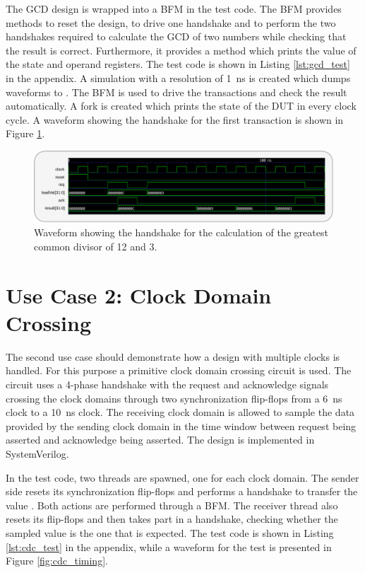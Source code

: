 The GCD design is wrapped into a BFM in the test code. The BFM provides methods to reset the design, to drive one
handshake and to perform the two handshakes required to calculate the GCD of two numbers while checking that the
result is correct. Furthermore, it provides a method which prints the value of the state and operand registers. The
test code is shown in Listing \ref{lst:gcd_test} in the appendix. A simulation with a resolution of \SI{1}{ns} is
created which dumps waveforms to . The BFM is used to drive the transactions and check the result
automatically. A fork is created which prints the state of the DUT in every clock cycle. A waveform showing the
handshake for the first transaction is shown in Figure \ref{fig:gcd_timing}.

\begin{figure}[t]
  \centering
  \includegraphics[width=\textwidth]{diagrams/gcd_timing.pdf}
  \caption{Waveform showing the handshake for the calculation of the greatest common divisor of 12 and 3.}
  \label{fig:gcd_timing}
\end{figure}

\section{Use Case 2: Clock Domain Crossing} %

The second use case should demonstrate how a design with multiple clocks is handled. For this purpose a primitive
clock domain crossing circuit is used. The circuit uses a 4-phase handshake with the request and acknowledge signals
crossing the clock domains through two synchronization flip-flops from a \SI{6}{ns} clock to a \SI{10}{ns} clock. The
receiving clock domain is allowed to sample the data provided by the sending clock domain in the time window between
request being asserted and acknowledge being asserted. The design is implemented in SystemVerilog.

In the test code, two threads are spawned, one for each clock domain. The sender side resets its synchronization
flip-flops and performs a handshake to transfer the value . Both actions are performed through a BFM.
The receiver thread also resets its flip-flops and then takes part in a handshake, checking whether the sampled value
is the one that is expected. The test code is shown in Listing \ref{lst:cdc_test} in the appendix, while a waveform
for the test is presented in Figure \ref{fig:cdc_timing}.

